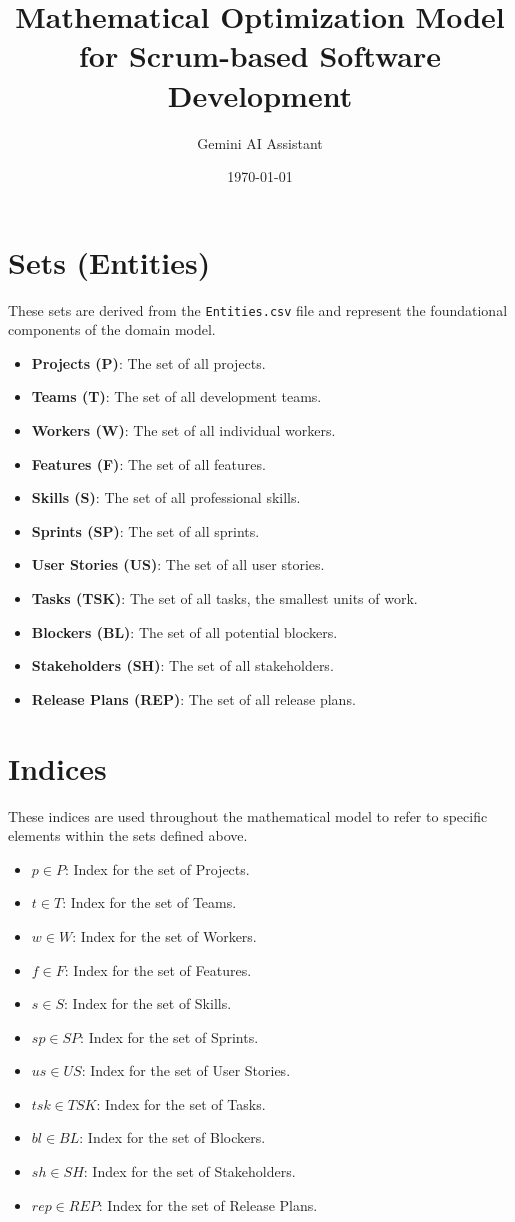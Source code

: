 \documentclass[11pt]{article}
\title{Mathematical Optimization Model for Scrum-based Software Development}
\author{Gemini AI Assistant}
\date{\today}
\begin{document}
\maketitle
\newpage
\tableofcontents
\newpage

\section{Sets (Entities)}
These sets are derived from the \texttt{Entities.csv} file and represent the foundational components of the domain model.
\begin{itemize}
    \item \textbf{Projects (P)}: The set of all projects.
    \item \textbf{Teams (T)}: The set of all development teams.
    \item \textbf{Workers (W)}: The set of all individual workers.
    \item \textbf{Features (F)}: The set of all features.
    \item \textbf{Skills (S)}: The set of all professional skills.
    \item \textbf{Sprints (SP)}: The set of all sprints.
    \item \textbf{User Stories (US)}: The set of all user stories.
    \item \textbf{Tasks (TSK)}: The set of all tasks, the smallest units of work.
    \item \textbf{Blockers (BL)}: The set of all potential blockers.
    \item \textbf{Stakeholders (SH)}: The set of all stakeholders.
    \item \textbf{Release Plans (REP)}: The set of all release plans.
\end{itemize}

\section{Indices}
These indices are used throughout the mathematical model to refer to specific elements within the sets defined above.
\begin{itemize}
    \item $p \in P$: Index for the set of Projects.
    \item $t \in T$: Index for the set of Teams.
    \item $w \in W$: Index for the set of Workers.
    \item $f \in F$: Index for the set of Features.
    \item $s \in S$: Index for the set of Skills.
    \item $sp \in SP$: Index for the set of Sprints.
    \item $us \in US$: Index for the set of User Stories.
    \item $tsk \in TSK$: Index for the set of Tasks.
    \item $bl \in BL$: Index for the set of Blockers.
    \item $sh \in SH$: Index for the set of Stakeholders.
    \item $rep \in REP$: Index for the set of Release Plans.
\end{itemize}
\end{document}

